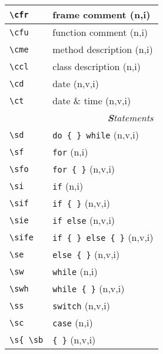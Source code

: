 \documentclass[oneside,10pt,landscape,DIV16]{scrartcl}
\begin{document}
\begin{multicols}{3}
\begin{center}
\begin{tabular}[]{|p{13mm}|p{56mm}|}
\hline \verb'\cfr'& frame comment                           \hfill (n,i)\\
\hline \verb'\cfu'& function comment                        \hfill (n,i)\\
\hline \verb'\cme'& method description                      \hfill (n,i)\\
\hline \verb'\ccl'& class description                       \hfill (n,i)\\
\hline \verb'\cd' & date                                    \hfill (n,v,i)\\
\hline \verb'\ct' & date \& time                            \hfill (n,v,i)\\
\hline 
\hline
\multicolumn{2}{|r|}{\textsl{\textbf{S}tatements}} \\
\hline \verb'\sd'  & \verb'do { } while'        \hfill (n,v,i)\\
\hline \verb'\sf'  & \verb'for'                 \hfill (n,i)\\
\hline \verb'\sfo' & \verb'for { }'             \hfill (n,v,i)\\
\hline \verb'\si'  & \verb'if'                  \hfill (n,i)\\
\hline \verb'\sif' & \verb'if { }'              \hfill (n,v,i)\\
\hline \verb'\sie' & \verb'if else'             \hfill (n,v,i)\\
\hline \verb'\sife'& \verb'if { } else { }'     \hfill (n,v,i)\\
\hline \verb'\se'  & \verb'else { }'            \hfill (n,v,i)\\
\hline \verb'\sw'  & \verb'while'               \hfill (n,i)\\
\hline \verb'\swh' & \verb'while { }'           \hfill (n,v,i)\\
\hline \verb'\ss'  & \verb'switch'              \hfill (n,v,i)\\
\hline \verb'\sc'  & \verb'case'                \hfill (n,i)\\
\hline \verb'\s{ \sb'  & \verb'{ }'                 \hfill (n,v,i)\\
\hline
\end{tabular}\\
%

\end{center}
\end{multicols}
\end{document}
